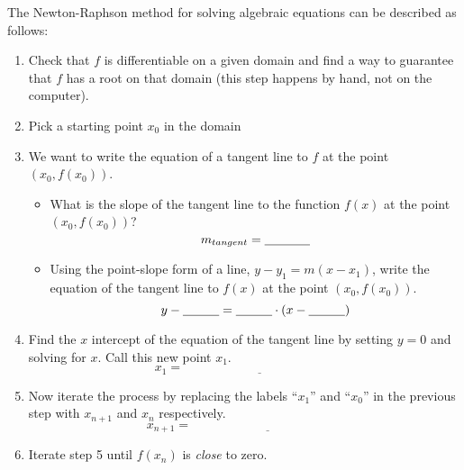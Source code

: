 \begin{algorithm}
    The Newton-Raphson method for solving algebraic equations can be described as follows:
    \begin{enumerate}
        \item Check that $f$ is differentiable on a given domain and find
            a way to guarantee that $f$ has a root on that domain (this step happens by
            hand, not on the computer).
        \item Pick a starting point $x_0$ in the domain
        \item We want to write the equation of a tangent line to $f$ at the point $(x_0,
            f(x_0))$.  
            \begin{itemize}
                \item What is the slope of the tangent line to the function $f(x)$ at the
                    point $(x_0, f(x_0))$?
                    \[ m_{tangent} = \underline{\hspace{0.5in}} \]
                \item Using the point-slope form of a line, $y-y_1 = m(x-x_1)$, write the
                    equation of the tangent line to $f(x)$ at the point $(x_0, f(x_0))$.
            \[ y - \underline{\hspace{0.4in}} = \underline{\hspace{0.4in}} \cdot \left(
                x - \underline{\hspace{0.4in}} \right) \]
            \end{itemize}
            \solution{
                \[ y - f(x_0) = f'(x_0) \left( x-x_0 \right) \]
            }
        \item Find the $x$ intercept of the equation of the tangent line by setting $y=0$
            and solving for $x$.  Call this new
            point $x_1$.  
            \[ x_1 = \underline{\hspace{2in}} \]
            \solution{
                \[ x_1 = x_0 - \frac{f(x_0)}{f'(x_0)} \]
            }
        \item Now iterate the process by replacing the labels ``$x_1$'' and ``$x_0$'' in
            the previous step with $x_{n+1}$ and $x_{n}$ respectively.
            \[ x_{n+1} = \underline{\hspace{2in}} \]
            \solution{
                \[ x_{n+1} = x_{n} - \frac{f(x_n)}{f'(x_n)} \]
            }
        \item Iterate step 5 until $f(x_{n})$ is {\it close} to zero.
    \end{enumerate}
\end{algorithm}

